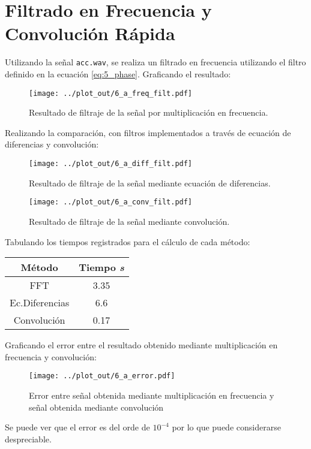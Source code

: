 \section{Filtrado en Frecuencia y Convolución Rápida}
	Utilizando la señal \texttt{acc.wav}, se realiza un filtrado en frecuencia utilizando el filtro definido en la ecuación \ref{eq:5_phase}. Graficando el resultado:
		\begin{figure}[H]
			\center
			\texttt{[image: ../plot\_out/6\_a\_freq\_filt.pdf]}
			\caption{Resultado de filtraje de la señal por multiplicación en frecuencia.}
		\end{figure}	
		
		Realizando la comparación, con filtros implementados a través de ecuación de diferencias y convolución:
		\begin{figure}[H]
			\center
			\texttt{[image: ../plot\_out/6\_a\_diff\_filt.pdf]}
			\caption{Resultado de filtraje de la señal mediante ecuación de diferencias.}
			\label{fig:6_a_diff_filt}
		\end{figure}	

		\begin{figure}[H]
			\center
			\texttt{[image: ../plot\_out/6\_a\_conv\_filt.pdf]}
			\caption{Resultado de filtraje de la señal mediante convolución.}
			\label{fig:6_a_conv_filt}
		\end{figure}			
		
		Tabulando los tiempos registrados para el cálculo de cada método:
		\begin{table}[H]
			\center
			\begin{tabular}{|c|c|}
				\hline
				\textbf{Método} & \textbf{Tiempo} \textit{s} \\
				\hline
				FFT &  3.35 \\
				\hline
				Ec.Diferencias & 6.6 \\
				\hline
				Convolución & 0.17 \\
				\hline
			\end{tabular}
		\end{table}
		
		Graficando el error entre el resultado obtenido mediante multiplicación en frecuencia y convolución:
		\begin{figure}[H]
			\center
			\texttt{[image: ../plot\_out/6\_a\_error.pdf]}
			\caption{Error entre señal obtenida mediante multiplicación en frecuencia y señal obtenida mediante convolución}
			\label{fig:6_a_error}
		\end{figure}			
		
		Se puede ver que el error es del orde de $10^{-4}$ por lo que puede considerarse despreciable.